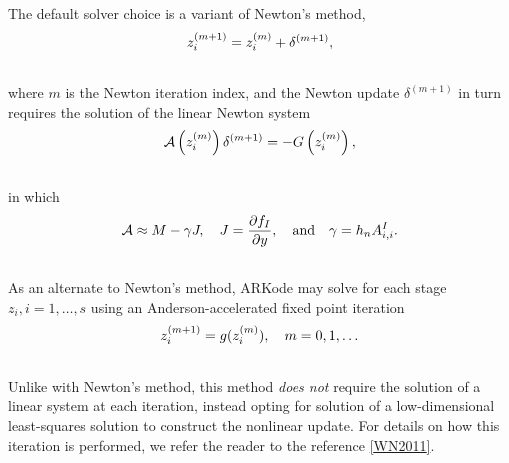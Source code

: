\documentclass[letterpaper,10pt,english]{sphinxmanual}
\begin{document}
The default solver choice is a variant of Newton's method,
\label{Mathematics:equation-Newton_iteration}\begin{gather}
\begin{split}z_i^{(m+1)} = z_i^{(m)} + \delta^{(m+1)},\end{split}\label{Mathematics-Newton_iteration}\\\begin{split}\end{split}\notag
\end{gather}
where $m$ is the Newton iteration index, and the Newton
update $\delta^{(m+1)}$ in turn requires the solution of the
linear Newton system
\label{Mathematics:equation-Newton_system}\begin{gather}
\begin{split}{\mathcal A}\left(z_i^{(m)}\right) \delta^{(m+1)} = -G\left(z_i^{(m)}\right),\end{split}\label{Mathematics-Newton_system}\\\begin{split}\end{split}\notag
\end{gather}
in which
\label{Mathematics:equation-NewtonMatrix}\begin{gather}
\begin{split}{\mathcal A} \approx M - \gamma J, \quad J = \frac{\partial f_I}{\partial y},
\quad\text{and}\quad \gamma = h_n A^I_{i,i}.\end{split}\label{Mathematics-NewtonMatrix}\\\begin{split}\end{split}\notag
\end{gather}
As an alternate to Newton's method, ARKode may solve for each stage
$z_i, i=1,\ldots,s$ using an Anderson-accelerated fixed
point iteration
\label{Mathematics:equation-AAFP_iteration}\begin{gather}
\begin{split}z_i^{(m+1)} = g(z_i^{(m)}), \quad m=0,1,\ldots\end{split}\label{Mathematics-AAFP_iteration}\\\begin{split}\end{split}\notag
\end{gather}
Unlike with Newton's method, this method \emph{does not} require the
solution of a linear system at each iteration, instead opting for
solution of a low-dimensional least-squares solution to construct the
nonlinear update.  For details on how this iteration is performed, we
refer the reader to the reference {\hyperref[References:wn2011]{{[}WN2011{]}}}.
\end{document}
